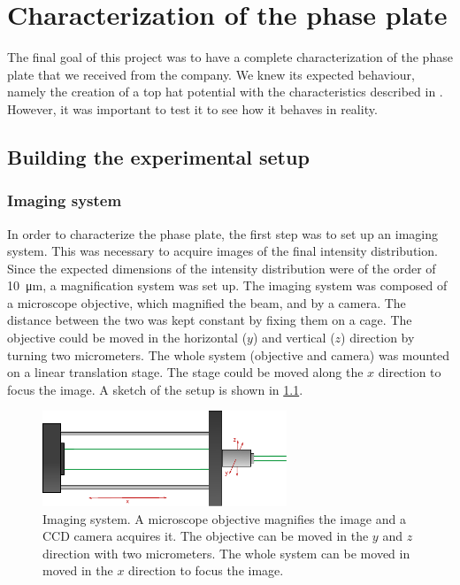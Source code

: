 \chapter{Characterization of the phase plate}
The final goal of this project was to have a complete characterization of the phase plate that we received from the company. We knew its expected behaviour, namely the creation of a top hat potential with the characteristics described in . However, it was important to test it to see how it behaves in reality.

\section{Building the experimental setup}
\subsection{Imaging system}
In order to characterize the phase plate, the first step was to set up an imaging system. This was necessary to acquire images of the final intensity distribution. Since the expected dimensions of the intensity distribution were of the order of \SI{10}{\micro\meter}, a magnification system was set up. The imaging system was composed of a microscope objective, which magnified the beam, and by a camera. The distance between the two was kept constant by fixing them on a cage. The objective could be moved in the horizontal ($y$) and vertical ($z$) direction by turning two micrometers. The whole system (objective and camera) was mounted on a linear translation stage. The stage could be moved along the $x$ direction to focus the image. A sketch of the setup is shown in \cref{fig:imaging}.

\begin{figure}
    \centering
    \includegraphics[width=0.65\textwidth]{chapters/chapter_3/figures/imaging}
    \caption{Imaging system. A microscope objective magnifies the image and a CCD camera acquires it. The objective can be moved in the $y$ and $z$ direction with two micrometers. The whole system can be moved in moved in the $x$ direction to focus the image.}
    \label{fig:imaging}
\end{figure}

